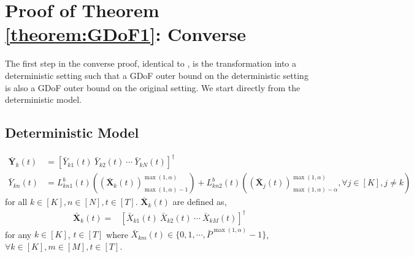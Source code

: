 \documentclass[11pt]{article}
\begin{document}
\section{Proof of Theorem \ref{theorem:GDoF1}: Converse}
 The first step in the converse proof, identical to \cite{Arash_Jafar_IC},
 is the transformation
into a deterministic setting such that a GDoF outer bound
on the deterministic setting is also a GDoF outer bound on
the original setting.  We start directly from the deterministic
model.

\subsection{Deterministic Model}\label{DM_1}
\vspace{-1em}
\begin{align}
\bar{\mathbf{Y}}_{k}(t)&=[\bar{Y}_{k1}(t)\ \bar{Y}_{k2}(t)\ \cdots\ \bar{Y}_{kN}(t)]^\dagger\\
\bar{Y}_{kn}(t)&=L_{kn1}^b(t)\left({(\bar{\mathbf{X}}_{k}(t))}^{\max(1,\alpha)}_{\max(1,\alpha)-1}\right)+L_{kn2}^b(t)\left({(\bar{\mathbf{X}}_{j}(t))}^{\max(1,\alpha)}_{\max(1,\alpha)-\alpha},\forall j\in[K],j\neq k\right)\label{dm1}
\end{align}
for all $k\in[K],n\in[N],t\in[T]$. $\bar{\mathbf{X}}_{k}(t)$ are  defined as,
\begin{align}
\bar{\mathbf{X}}_{k}(t)=&[\bar{X}_{k1}(t)\ \bar{X}_{k2}(t)\ \cdots\ \bar{X}_{kM}(t)]^\dagger\label{ggf1}
\end{align}
for any $k\in[K]$, $t\in[T]$ where $\bar{X}_{km}(t)\in\{0, 1, \cdots, {\bar{P}}^{\max(1,\alpha)}-1\}$, $\forall k\in[K],m\in[M],t\in[T]$. 
\end{document}
